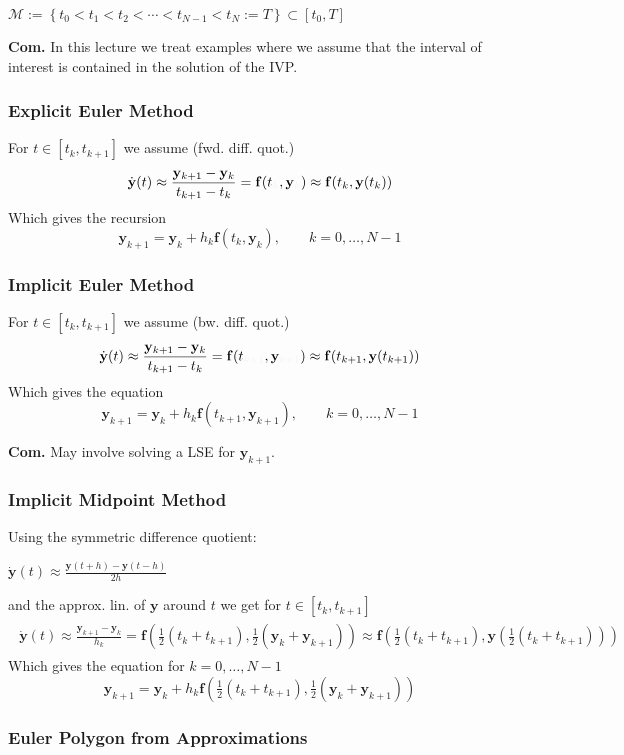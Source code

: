 \documentclass[a4paper,11pt]{extarticle}
\makeatletter
\def\mc#1#{\@mc{#1}}
\def\@mc#1#2#3{%
  \protect\leavevmode
  \begingroup
    \color#1{#2}#3%
  \endgroup
}
\newcommand{\mcb}[1]{\mc{lighttext}{#1}}
\newcommand{\mcb}[1]{\mc{blue}{#1}}
\newcommand{\cM}{\mathcal{M}}
\newcommand{\set}[1]{\left\{ #1 \right\}}
\renewcommand{\vec}[1]{\mathbf{#1}}
\newcommand{\vf}{\vec{f}}
\newcommand{\vy}{\vec{y}}
\newcommand{\Com}{\textbf{Com.} }
\makeatother
\begin{document}
\begin{multicols*}{2}
$\cM:=\set{t_0<t_1<t_2<\cdots<t_{N-1}<t_N:=T}\subset[t_0,T]$

\Com In this lecture we treat examples where we assume that the interval of
interest is contained in the solution of the IVP.

\subsubsection{Explicit Euler Method}
For $t\in[t_k,t_{k+1}]$ we assume (fwd. diff. quot.)
\[
\dot{\vy}(t) \approx
\frac{\vy_{k+1}-\vy_k}{t_{k+1}-t_k} = \vf(t_{\mcb{k}},\vy_{\mcb{k}})
\approx
\vf(t_k,\vy(t_k))
\]
Which gives the recursion
\[
\vy_{k+1}=\vy_{k}+h_k\vf(t_k,\vy_k), \qquad
k=0,\ldots,N-1
\]

\subsubsection{Implicit Euler Method}
For $t\in[t_k,t_{k+1}]$ we assume (bw. diff. quot.)
\[
\dot{\vy}(t) \approx
\frac{\vy_{k+1}-\vy_k}{t_{k+1}-t_k} = \vf(t_{\mcb{k+1}},\vy_{\mcb{k+1}})
\approx
\vf(t_{k+1},\vy(t_{k+1}))
\]
Which gives the equation
\[
\vy_{k+1}=\vy_{k}+h_k\vf(t_{k+1},\vy_{k+1}), \qquad
k=0,\ldots,N-1
\]

\Com May involve solving a LSE for $\vy_{k+1}$.

\subsubsection{Implicit Midpoint Method}
Using the symmetric difference quotient:

$
\dot{\vy}(t)\approx
\frac{\vy(t+h)-\vy(t-h)}{2h}
$

and the approx. lin. of $\vy$ around $t$ we get for $t\in[t_k,t_{k+1}]$
\begin{gather*}
\begin{align*}
\dot{\vy}(t)\approx
\frac{\vy_{k+1}-\vy_{k}}{h_k}
=
\vf\left(
\tfrac{1}{2}(t_{k}+t_{k+1}),
\tfrac{1}{2}(\vy_k+\vy_{k+1})
\right)
\approx
\vf\left(
\tfrac{1}{2}(t_{k}+t_{k+1}),
\vy\left(\tfrac{1}{2}(t_{k}+t_{k+1})\right)
\right)
\end{align*}
\end{gather*}
Which gives the equation for $k=0,\ldots,N-1$
\[
\vy_{k+1}
=
\vy_{k}+h_k
\vf\left(
\tfrac{1}{2}(t_{k}+t_{k+1}),
\tfrac{1}{2}(\vy_k+\vy_{k+1})
\right)
\]


\subsubsection{Euler Polygon from Approximations}


\end{multicols*}
\end{document}
